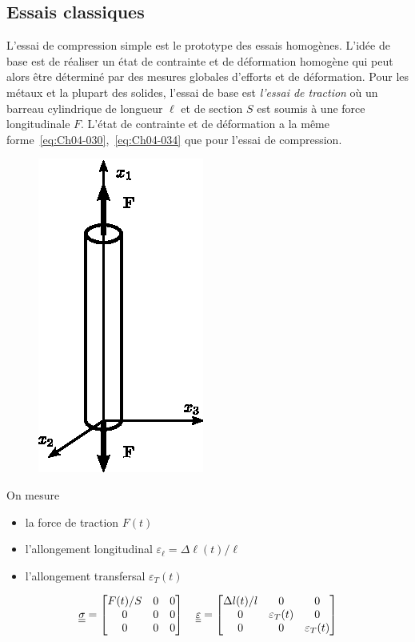 \subsection{Essais classiques} \label{ssec:Ch04-1.4}
L'essai de compression simple est le prototype des essais homogènes.
L'idée de base est de réaliser un état de contrainte et de déformation homogène qui peut alors être déterminé par des mesures globales d'efforts et de déformation.
Pour les métaux et la plupart des solides, l'essai de base est \emph{l'essai de traction} où un barreau cylindrique de longueur $\ell$ et de section $S$ est soumis à une force longitudinale $F$.
L'état de contrainte et de déformation a la même forme~\eqref{eq:Ch04-030},~\eqref{eq:Ch04-034} que pour l'essai de compression.

\begin{figure}
    \begin{center}
        \includegraphics{../images/T1_Ch04-0007}
    \end{center}
\end{figure}
On mesure 
\begin{itemize}
    \item la force de traction $F(t)$
    \item l'allongement longitudinal $\varepsilon_\ell = \Delta \ell(t)/\ell$
    \item l'allongement transfersal $\varepsilon_T(t)$
\end{itemize}
\begin{equation}
    \underline{\underline{\sigma}} =
    \begin{bmatrix}
        F(t)/S & 0 & 0 \\
        0 & 0 & 0 \\
        0 & 0 & 0
    \end{bmatrix}
    \quad
    \underline{\underline{\varepsilon}} = 
    \begin{bmatrix}
        \Delta l(t)/l & 0 & 0 \\
        0 & \varepsilon_T(t) & 0 \\
        0 & 0 & \varepsilon_T(t)
    \end{bmatrix}
    \label{eq:Ch04-035}
\end{equation}

